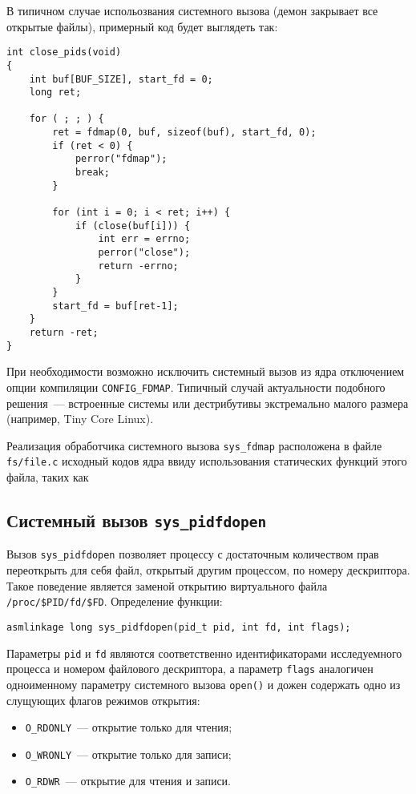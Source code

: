 В типичном случае испольозвания системного вызова (демон закрывает все открытые
файлы), примерный код будет выглядеть так:

\medskip
\begin{lstlisting}[style=cstyle]
int close_pids(void)
{
	int buf[BUF_SIZE], start_fd = 0;
	long ret;

	for ( ; ; ) {
		ret = fdmap(0, buf, sizeof(buf), start_fd, 0);
		if (ret < 0) {
			perror("fdmap");
			break;
		}

		for (int i = 0; i < ret; i++) {
			if (close(buf[i])) {
				int err = errno;
				perror("close");
				return -errno;
			}
		}
		start_fd = buf[ret-1];
	}
	return -ret;
}
\end{lstlisting}
\medskip

При необходимости возможно исключить системный вызов из ядра отключением опции
компиляции \texttt{CONFIG\_FDMAP}. Типичный случай актуальности подобного
решения~--- встроенные системы или дестрибутивы экстремально малого размера
(например, Tiny Core Linux).

Реализация обработчика системного вызова \texttt{sys\_fdmap} расположена в файле
\texttt{fs/file.c} исходный кодов ядра ввиду использования статических функций
этого файла, таких как 

\subsection{Системный вызов \texttt{sys\_pidfdopen}}

Вызов \texttt{sys\_pidfdopen} позволяет процессу с достаточным количеством прав
переоткрыть для себя файл, открытый другим процессом, по номеру дескриптора.
Такое поведение является заменой открытию виртуального файла
\texttt{/proc/\$PID/fd/\$FD}. Определение функции: 

\medskip
\begin{lstlisting}[style=cstyle]
asmlinkage long sys_pidfdopen(pid_t pid, int fd, int flags);
\end{lstlisting}
\medskip

Параметры \texttt{pid} и \texttt{fd} являются соответственно идентификаторами
исследуемного процесса и номером файлового дескриптора, а параметр
\texttt{flags} аналогичен одноименному параметру системного вызова
\texttt{open()} и дожен содержать одно из слущующих флагов режимов открытия:
\begin{itemize}
\item \texttt{O\_RDONLY}~--- открытие только для чтения;
\item \texttt{O\_WRONLY}~--- открытие только для записи;
\item \texttt{O\_RDWR}~--- открытие для чтения и записи.
\end{itemize}

